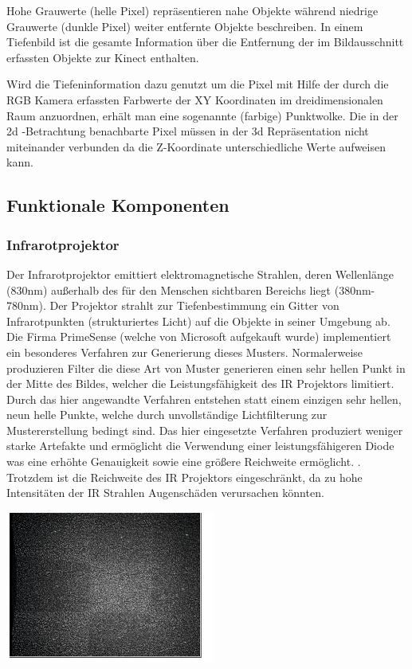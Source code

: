 \documentclass[appendixprefix,a4paper,bibliography=totoc,twoside=true,11pt,DIV=11,BCOR=6mm,headsepline,pointlessnumbers]{scrbook}
\begin{document}
Hohe Grauwerte (helle Pixel) repräsentieren nahe Objekte während niedrige Grauwerte (dunkle Pixel) weiter entfernte Objekte beschreiben. In einem Tiefenbild ist die gesamte Information über die Entfernung der im Bildausschnitt erfassten Objekte zur Kinect enthalten.

Wird die Tiefeninformation dazu genutzt um die Pixel mit Hilfe der durch die RGB Kamera erfassten Farbwerte der XY Koordinaten im dreidimensionalen Raum anzuordnen, erhält man eine sogenannte (farbige) Punktwolke. Die in der 2d 
-Betrachtung benachbarte Pixel müssen in der 3d Repräsentation nicht miteinander verbunden da die Z-Koordinate unterschiedliche Werte aufweisen kann.
\subsection{Funktionale Komponenten}
\subsubsection{Infrarotprojektor}

Der Infrarotprojektor emittiert elektromagnetische Strahlen, deren Wellenlänge (830nm) außerhalb des für den Menschen sichtbaren Bereichs liegt (380nm-780nm).
Der Projektor strahlt zur Tiefenbestimmung ein Gitter von Infrarotpunkten (strukturiertes Licht) auf die Objekte in seiner Umgebung ab. 
Die Firma PrimeSense (welche von Microsoft aufgekauft wurde) implementiert ein besonderes Verfahren zur Generierung dieses Musters.
Normalerweise produzieren Filter die diese Art von Muster generieren einen sehr hellen Punkt in der Mitte des Bildes, welcher die Leistungsfähigkeit des IR Projektors limitiert.\\


Durch das hier angewandte Verfahren entstehen statt einem einzigen sehr hellen, neun helle Punkte, welche durch unvollständige Lichtfilterung zur Mustererstellung bedingt sind. Das hier eingesetzte Verfahren produziert weniger starke Artefakte und ermöglicht die Verwendung einer leistungsfähigeren Diode was eine erhöhte Genauigkeit sowie eine größere Reichweite ermöglicht. . Trotzdem ist die Reichweite des IR Projektors eingeschränkt, da zu hohe Intensitäten der IR Strahlen Augenschäden verursachen könnten.


\includegraphics[height=5cm]{Res/9_Dots.png}
\end{document}
